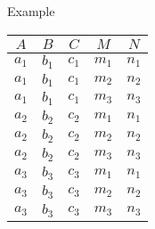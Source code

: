 \begin{multicols}{2}
\begin{CheatsheetEntryFrame}
\begin{RelAlgSubsection}{Example}
\begin{center}
{\begin{tabular}{|ccccc|}
                    \multicolumn{1}{|c}{$A$}
                        & \multicolumn{1}{c}{$B$}
                        & \multicolumn{1}{c}{$C$}
                        & \multicolumn{1}{c}{$M$}
                        & \multicolumn{1}{c|}{$N$}
                        \\ \hline\hline
                    $a_1$ & $b_1$ & $c_1$ & $m_1$ & $n_1$ \\
                    $a_1$ & $b_1$ & $c_1$ & $m_2$ & $n_2$ \\
                    $a_1$ & $b_1$ & $c_1$ & $m_3$ & $n_3$ \\
                    $a_2$ & $b_2$ & $c_2$ & $m_1$ & $n_1$ \\
                    $a_2$ & $b_2$ & $c_2$ & $m_2$ & $n_2$ \\
                    $a_2$ & $b_2$ & $c_2$ & $m_3$ & $n_3$ \\
                    $a_3$ & $b_3$ & $c_3$ & $m_1$ & $n_1$ \\
                    $a_3$ & $b_3$ & $c_3$ & $m_2$ & $n_2$ \\
                    $a_3$ & $b_3$ & $c_3$ & $m_3$ & $n_3$ \\ \hline
                \end{tabular}
            }
        \end{center}
        \end{RelAlgSubsection}

    \end{CheatsheetEntryFrame}

\end{multicols}
\newpage
